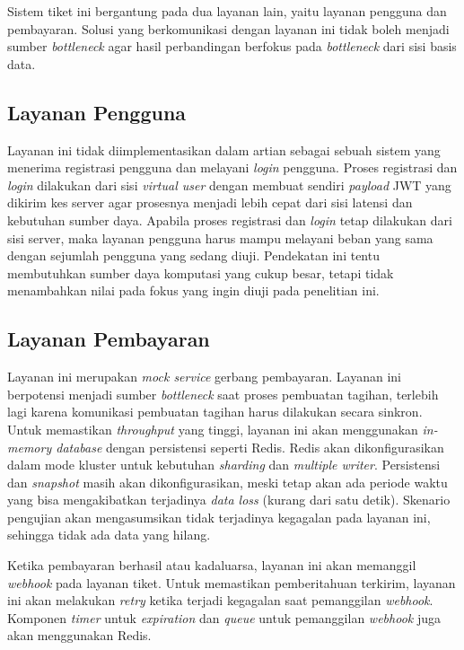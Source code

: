 Sistem tiket ini bergantung pada dua layanan lain, yaitu layanan pengguna dan pembayaran. Solusi yang berkomunikasi dengan layanan ini tidak boleh menjadi sumber \textit{bottleneck} agar hasil perbandingan berfokus pada \textit{bottleneck} dari sisi basis data.

\subsection{Layanan Pengguna}

Layanan ini tidak diimplementasikan dalam artian sebagai sebuah sistem yang menerima registrasi pengguna dan melayani \textit{login} pengguna. Proses registrasi dan \textit{login} dilakukan dari sisi \textit{virtual user} dengan membuat sendiri \textit{payload} JWT yang dikirim kes server agar prosesnya menjadi lebih cepat dari sisi latensi dan kebutuhan sumber daya. Apabila proses registrasi dan \textit{login} tetap dilakukan dari sisi server, maka layanan pengguna harus mampu melayani beban yang sama dengan sejumlah pengguna yang sedang diuji. Pendekatan ini tentu membutuhkan sumber daya komputasi yang cukup besar, tetapi tidak menambahkan nilai pada fokus yang ingin diuji pada penelitian ini.

\subsection{Layanan Pembayaran}

Layanan ini merupakan \textit{mock service} gerbang pembayaran. Layanan ini berpotensi menjadi sumber \textit{bottleneck} saat proses pembuatan tagihan, terlebih lagi karena komunikasi pembuatan tagihan harus dilakukan secara sinkron. Untuk memastikan \textit{throughput} yang tinggi, layanan ini akan menggunakan \textit{in-memory database} dengan persistensi seperti Redis. Redis akan dikonfigurasikan dalam mode kluster untuk kebutuhan \textit{sharding} dan \textit{multiple writer}. Persistensi dan \textit{snapshot} masih akan dikonfigurasikan, meski tetap akan ada periode waktu yang bisa mengakibatkan terjadinya \textit{data loss} (kurang dari satu detik). Skenario pengujian akan mengasumsikan tidak terjadinya kegagalan pada layanan ini, sehingga tidak ada data yang hilang.

Ketika pembayaran berhasil atau kadaluarsa, layanan ini akan memanggil \textit{webhook} pada layanan tiket. Untuk memastikan pemberitahuan terkirim, layanan ini akan melakukan \textit{retry} ketika terjadi kegagalan saat pemanggilan \textit{webhook}. Komponen \textit{timer} untuk \textit{expiration} dan \textit{queue} untuk pemanggilan \textit{webhook} juga akan menggunakan Redis.

